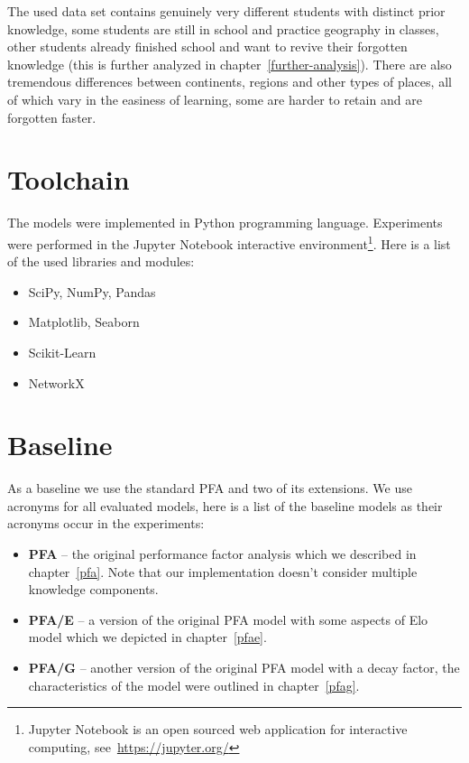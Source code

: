 The used data set contains genuinely very different students with distinct prior knowledge, some students are still in school and practice geography in classes, other students already finished school and want to revive their forgotten knowledge (this is further analyzed in chapter~\ref{further-analysis}). There are also tremendous differences between continents, regions and other types of places, all of which vary in the easiness of learning, some are harder to retain and are forgotten faster.

\section{Toolchain}

The models were implemented in Python programming language. Experiments were performed in the Jupyter Notebook interactive environment\footnote{Jupyter Notebook is an open sourced web application for interactive computing, see~\url{https://jupyter.org/}}. Here is a list of the used libraries and modules:

\begin{itemize}
  \item SciPy, NumPy, Pandas
  \item Matplotlib, Seaborn
  \item Scikit-Learn
  \item NetworkX
\end{itemize}

\section{Baseline}

As a baseline we use the standard PFA and two of its extensions. We use acronyms for all evaluated models, here is a list of the baseline models as their acronyms occur in the experiments:

\begin{itemize}
  \item \textbf{PFA} -- the original performance factor analysis which we described in chapter~\ref{pfa}. Note that our implementation doesn't consider multiple knowledge components.
  \item \textbf{PFA/E} -- a version of the original PFA model with some aspects of Elo model which we depicted in chapter~\ref{pfae}.
  \item \textbf{PFA/G} -- another version of the original PFA model with a decay factor, the characteristics of the model were outlined in chapter~\ref{pfag}.
\end{itemize}

